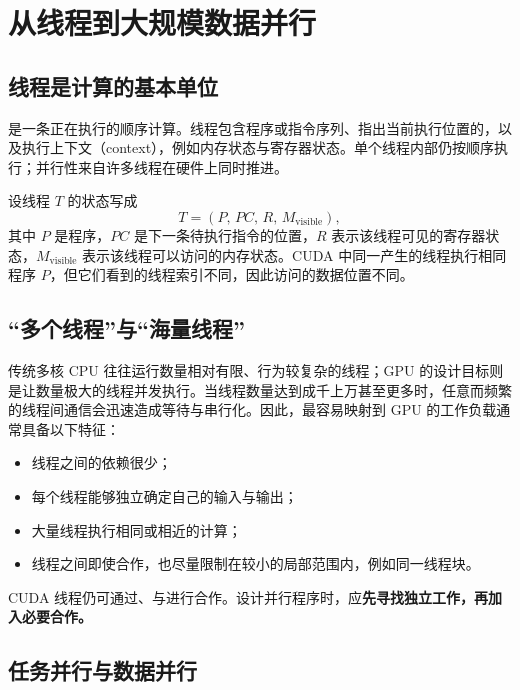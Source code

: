 \section{从线程到大规模数据并行}

\subsection{线程是计算的基本单位}

是一条正在执行的顺序计算。线程包含程序或指令序列、指出当前执行位置的，以及执行上下文（context），例如内存状态与寄存器状态。单个线程内部仍按顺序执行；并行性来自许多线程在硬件上同时推进。

\begin{keybox}[title={线程的最小心智模型}]
设线程 $T$ 的状态写成
\[
T = (P,\, PC,\, R,\, M_{\mathrm{visible}}),
\]
其中 $P$ 是程序，$PC$ 是下一条待执行指令的位置，$R$ 表示该线程可见的寄存器状态，$M_{\mathrm{visible}}$ 表示该线程可以访问的内存状态。CUDA 中同一产生的线程执行相同程序 $P$，但它们看到的线程索引不同，因此访问的数据位置不同。
\end{keybox}

\subsection{“多个线程”与“海量线程”}

传统多核 CPU 往往运行数量相对有限、行为较复杂的线程；GPU 的设计目标则是让数量极大的线程并发执行。当线程数量达到成千上万甚至更多时，任意而频繁的线程间通信会迅速造成等待与串行化。因此，最容易映射到 GPU 的工作负载通常具备以下特征：

\begin{itemize}
  \item 线程之间的依赖很少；
  \item 每个线程能够独立确定自己的输入与输出；
  \item 大量线程执行相同或相近的计算；
  \item 线程之间即使合作，也尽量限制在较小的局部范围内，例如同一线程块。
\end{itemize}

CUDA 线程仍可通过、与进行合作。设计并行程序时，应\textbf{先寻找独立工作，再加入必要合作。}

\subsection{任务并行与数据并行}


